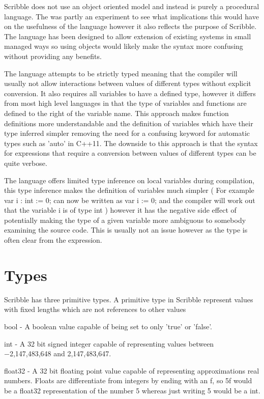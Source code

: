\documentclass[]{final_report}
\begin{document}
Scribble does not use an object oriented model and instead is purely a procedural language. The was partly an experiment to see what implications this would have on the usefulness of the language however it also reflects the purpose of Scribble. The language has been designed to allow extension of existing systems in small managed ways so using objects would likely make the syntax more confusing without providing any benefits.

The language attempts to be strictly typed meaning that the compiler will usually not allow interactions between values of different types without explicit conversion. It also requires all variables to have a defined type, however it differs from most high level languages in that the type of variables and functions are defined to the right of the variable name. This approach makes function definitions more understandable and the definition of variables which have their type inferred simpler removing the need for a confusing keyword for automatic types such as 'auto' in C++11. The downside to this approach is that the syntax for expressions that require a conversion between values of different types can be quite verbose.

The language offers limited type inference on local variables during compilation, this type inference makes the definition of variables much simpler ( For example var i : int := 0; can now be written as var i := 0; and the compiler will work out that the variable i is of type int ) however it has the negative side effect of potentially making the type of a given variable more ambiguous to somebody examining the source code. This is usually not an issue however as the type is often clear from the expression.

\section{Types}

Scribble has three primitive types. A primitive type in Scribble represent values with fixed lengths which are not references to other values

bool - A boolean value capable of being set to only 'true' or 'false'.

int - A 32 bit signed integer capable of representing values between  −2,147,483,648 and 2,147,483,647.

float32 - A 32 bit floating point value capable of representing approximations real numbers. Floats are differentiate from integers by ending with an f, so 5f would be a float32 representation of the number 5 whereas just writing 5 would be a int.
\end{document}
